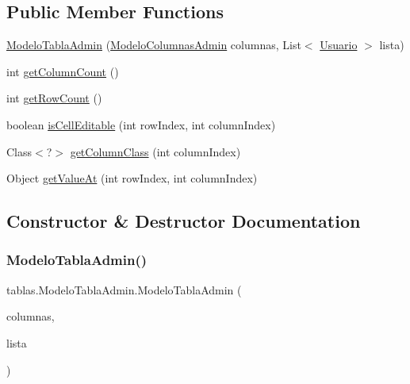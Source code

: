 \subsection*{Public Member Functions}
\begin{DoxyCompactItemize}
\item 
\mbox{\hyperlink{classtablas_1_1_modelo_tabla_admin_ac57a118044f0be24fab6510504fdb17b}{Modelo\+Tabla\+Admin}} (\mbox{\hyperlink{classtablas_1_1_modelo_columnas_admin}{Modelo\+Columnas\+Admin}} columnas, List$<$ \mbox{\hyperlink{classclases_1_1_usuario}{Usuario}} $>$ lista)
\item 
int \mbox{\hyperlink{classtablas_1_1_modelo_tabla_admin_a46f515cb2d0eb9fb7a3c121d90aad57d}{get\+Column\+Count}} ()
\item 
int \mbox{\hyperlink{classtablas_1_1_modelo_tabla_admin_aed3758bda11bc2cfde5eac6c48f3ede7}{get\+Row\+Count}} ()
\item 
boolean \mbox{\hyperlink{classtablas_1_1_modelo_tabla_admin_a2cf76f675696d1fc2362585a35b3aff4}{is\+Cell\+Editable}} (int row\+Index, int column\+Index)
\item 
Class$<$?$>$ \mbox{\hyperlink{classtablas_1_1_modelo_tabla_admin_ae5fbe6e373605a9768d45ae597b5df62}{get\+Column\+Class}} (int column\+Index)
\item 
Object \mbox{\hyperlink{classtablas_1_1_modelo_tabla_admin_a58534b1806090e0e2f171402e430cebc}{get\+Value\+At}} (int row\+Index, int column\+Index)
\end{DoxyCompactItemize}


\subsection{Constructor \& Destructor Documentation}
\mbox{\label{classtablas_1_1_modelo_tabla_admin_ac57a118044f0be24fab6510504fdb17b}} 
\subsubsection{\texorpdfstring{Modelo\+Tabla\+Admin()}{ModeloTablaAdmin()}}
{\footnotesize\ttfamily tablas.\+Modelo\+Tabla\+Admin.\+Modelo\+Tabla\+Admin (\begin{DoxyParamCaption}\item[{\mbox{\hyperlink{classtablas_1_1_modelo_columnas_admin}{Modelo\+Columnas\+Admin}}}]{columnas,  }\item[{List$<$ \mbox{\hyperlink{classclases_1_1_usuario}{Usuario}} $>$}]{lista }\end{DoxyParamCaption})}



